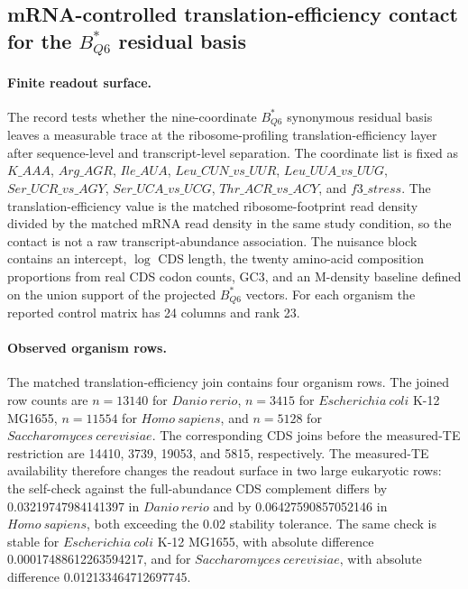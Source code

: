 \subsection{mRNA-controlled translation-efficiency contact for the $B^{\ast}_{Q6}$ residual basis}
\label{subsec:bioreality-q6-mrna-controlled-translation-efficiency-survival}

\paragraph{Finite readout surface.}
The record tests whether the nine-coordinate $B^{\ast}_{Q6}$ synonymous residual basis leaves a measurable trace at the ribosome-profiling translation-efficiency layer after sequence-level and transcript-level separation.  The coordinate list is fixed as $K\_AAA$, $Arg\_AGR$, $Ile\_AUA$, $Leu\_CUN\_vs\_UUR$, $Leu\_UUA\_vs\_UUG$, $Ser\_UCR\_vs\_AGY$, $Ser\_UCA\_vs\_UCG$, $Thr\_ACR\_vs\_ACY$, and $f3\_stress$.  The translation-efficiency value is the matched ribosome-footprint read density divided by the matched mRNA read density in the same study condition, so the contact is not a raw transcript-abundance association.  The nuisance block contains an intercept, $\log$ CDS length, the twenty amino-acid composition proportions from real CDS codon counts, GC3, and an M-density baseline defined on the union support of the projected $B^{\ast}_{Q6}$ vectors.  For each organism the reported control matrix has 24 columns and rank 23.

\paragraph{Observed organism rows.}
The matched translation-efficiency join contains four organism rows.  The joined row counts are $n=13140$ for $Danio\ rerio$, $n=3415$ for $Escherichia\ coli$ K-12 MG1655, $n=11554$ for $Homo\ sapiens$, and $n=5128$ for $Saccharomyces\ cerevisiae$.  The corresponding CDS joins before the measured-TE restriction are 14410, 3739, 19053, and 5815, respectively.  The measured-TE availability therefore changes the readout surface in two large eukaryotic rows: the self-check against the full-abundance CDS complement differs by 0.03219747984141397 in $Danio\ rerio$ and by 0.06427590857052146 in $Homo\ sapiens$, both exceeding the 0.02 stability tolerance.  The same check is stable for $Escherichia\ coli$ K-12 MG1655, with absolute difference 0.00017488612263594217, and for $Saccharomyces\ cerevisiae$, with absolute difference 0.012133464712697745.

